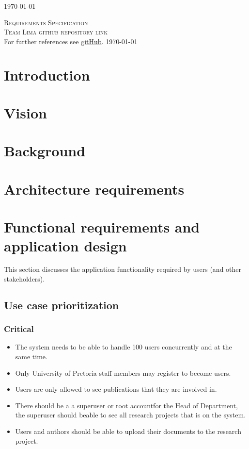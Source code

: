 \documentclass[a4paper,12pt]{report}
\begin{document}
\begin{titlepage}
\begin{center}
{\large \today}
\end{center}
\end{titlepage}
\footnotesize
\normalsize

\renewcommand{\thesection}{\arabic{section}}
\newpage
\begin{center}
\textsc{\LARGE Requirements Specification}\\[1.5cm]
\textsc{\Large Team Lima github repository link}\\[0.5cm]
For further references see \href{https://https://github.com/slugger7/team-lima}{gitHub}.
\today
\end{center}


\newpage
\section{Introduction}

\newpage
\section{Vision}

\newpage
\section{Background}

\newpage
\section{Architecture requirements}

\newpage
\section{Functional requirements and application design}
This section discusses the application functionality required by users (and other stakeholders).

\subsection{Use case prioritization}
\subsubsection{Critical}
	\begin{itemize}
		\item The system needs to be able to handle 100 users concurrently and at the same time.
		\item Only University of Pretoria staff members may register to become users.
		\item Users are only allowed to see publications that they are involved in.
		\item There should be a a superuser or root accountfor the Head of Department, the superuser should beable to see all research projects that is on the system.
		\item Users and authors should be able to upload their documents to the research project.
	\end{itemize}
\end{document}

